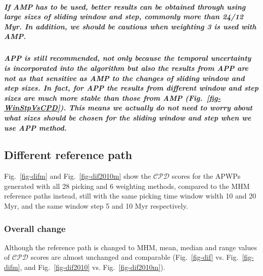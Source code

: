 \subparagraph{If AMP has to be used, better results can be obtained through
using large sizes of sliding window and step, commonly more than 24/12 Myr. In
addition, we should be cautious when weighting 3 is used with AMP.}

\subparagraph{APP is still recommended, not only because the temporal
uncertainty is incorporated into the algorithm but also the results from APP are
not as that sensitive as AMP to the changes of sliding window and step sizes. In
fact, for APP the results from different window and step sizes are much more
stable than those from AMP (Fig.~\ref{fig-WinStpVsCPD}). This means we actually
do not need to worry about what sizes should be chosen for the sliding window
and step when we use APP method.}


\subsection{Different reference path}

Fig.~\ref{fig-difm} and Fig.~\ref{fig-dif2010m} show the $\mathcal{CPD}$ scores
for the APWPs generated with all 28 picking and 6 weighting methods, compared to
the MHM reference paths instead, still with the same picking time window width
10 and 20 Myr, and the same window step 5 and 10 Myr respectively.

\subsubsection{Overall change}

Although the reference path is changed to MHM, mean, median and range values of
$\mathcal{CPD}$ scores are almost unchanged and comparable (Fig.~\ref{fig-dif}
vs. Fig.~\ref{fig-difm}, and Fig.~\ref{fig-dif2010} vs.
Fig.~\ref{fig-dif2010m}).

